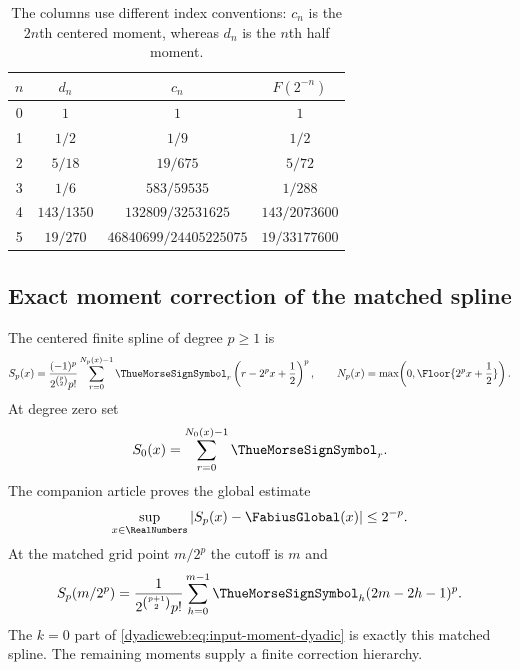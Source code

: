 \documentclass[11pt,oneside]{article}
\theoremstyle{definition}
\theoremstyle{remark}
\begin{document}
\begin{table}[ht]
\centering
\small
\begin{tabular}{@{}c c c c@{}}
\toprule
$n$ & $d_n$ & $c_n$ & $F(2^{-n})$ \\
\midrule
0 & $1$ & $1$ & $1$ \\
1 & $1/2$ & $1/9$ & $1/2$ \\
2 & $5/18$ & $19/675$ & $5/72$ \\
3 & $1/6$ & $583/59535$ & $1/288$ \\
4 & $143/1350$ & $132809/32531625$ & $143/2073600$ \\
5 & $19/270$ & $46840699/24405225075$ & $19/33177600$ \\
\bottomrule
\end{tabular}
\caption{The columns use different index conventions: $c_n$ is the $2n$th centered moment,
whereas $d_n$ is the $n$th half moment.}
\label{dyadicweb:tab:moments}
\end{table}

\subsection{Exact moment correction of the matched spline}
\label{dyadicweb:subsec:moment-corrected-spline}

The centered finite spline of degree $p\ge1$ is
\begin{equation}
 S_p(x)=\frac{(-1)^p}{2^{\binom p2}p!}
 \sum_{r=0}^{N_p(x)-1}\ThueMorseSignSymbol_r\left(r-2^px+\frac12\right)^p,
 \qquad
 N_p(x)=\max\!\left(0,\Floor{2^px+\frac12}\right). \label{dyadicweb:eq:centered-spline-local}
\end{equation}
At degree zero set
\begin{equation}
 S_0(x)=\sum_{r=0}^{N_0(x)-1}\ThueMorseSignSymbol_r.                        \label{dyadicweb:eq:S0-local}
\end{equation}
The companion article proves the global estimate
\begin{equation}
 \sup_{x\in\RealNumbers}|S_p(x)-\FabiusGlobal(x)|\le2^{-p}.             \label{dyadicweb:eq:centered-global-error-input}
\end{equation}
At the matched grid point $m/2^p$ the cutoff is $m$ and
\begin{equation}
 S_p(m/2^p)=\frac{1}{2^{\binom{p+1}{2}}p!}
 \sum_{h=0}^{m-1}\ThueMorseSignSymbol_h(2m-2h-1)^p.                       \label{dyadicweb:eq:matched-spline}
\end{equation}
The $k=0$ part of \eqref{dyadicweb:eq:input-moment-dyadic} is exactly this matched spline.  The remaining
moments supply a finite correction hierarchy.
\end{document}
